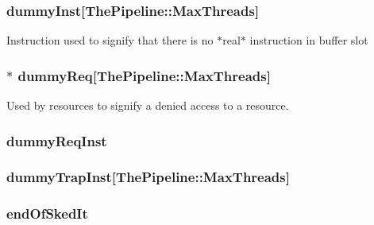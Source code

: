 \label{classInOrderCPU_a09dc4a08ace7d6e74531ffff1ba5d905}
\hypertarget{classInOrderCPU_a8f57f75c5150b34b12a0d461a8941704}{
\subsubsection[{dummyInst}]{ {\bf dummyInst}\mbox{[}{\bf ThePipeline::MaxThreads}\mbox{]}}}
\label{classInOrderCPU_a8f57f75c5150b34b12a0d461a8941704}
Instruction used to signify that there is no $\ast$real$\ast$ instruction in buffer slot \hypertarget{classInOrderCPU_a5366ca890575a006d6c51690c157a959}{
\subsubsection[{dummyReq}]{$\ast$ {\bf dummyReq}\mbox{[}{\bf ThePipeline::MaxThreads}\mbox{]}}}
\label{classInOrderCPU_a5366ca890575a006d6c51690c157a959}
Used by resources to signify a denied access to a resource. \hypertarget{classInOrderCPU_aee70a76b5dfeedede656757791734420}{
\subsubsection[{dummyReqInst}]{ {\bf dummyReqInst}}}
\label{classInOrderCPU_aee70a76b5dfeedede656757791734420}
\hypertarget{classInOrderCPU_a102452fdf27d60fc9d2520e37b358be1}{
\subsubsection[{dummyTrapInst}]{ {\bf dummyTrapInst}\mbox{[}{\bf ThePipeline::MaxThreads}\mbox{]}}}
\label{classInOrderCPU_a102452fdf27d60fc9d2520e37b358be1}
\hypertarget{classInOrderCPU_ae38b3e563def292648d9f34e094f8cc8}{
\subsubsection[{endOfSkedIt}]{ {\bf endOfSkedIt}}}
